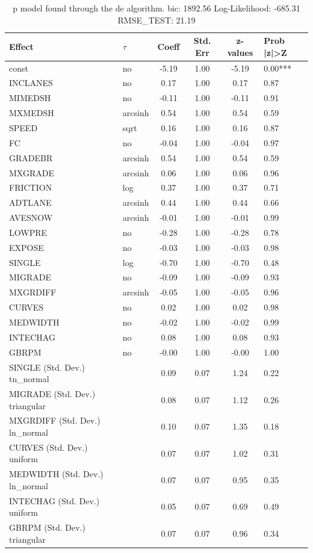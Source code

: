\begin{table}
	\caption{p model found through the de algorithm. bic: 1892.56 Log-Likelihood: -685.31 RMSE_TEST: 21.19}
	\begin{center}
		\begin{tabular}{|l|l|c|c|c|l|}
			\hline
			Effect & $\tau$ & Coeff & Std. Err & z-values & Prob |z|>Z \\
			\hline
			const & no & -5.19 & 1.00 & -5.19 & 0.00*** \\
			\hline
			INCLANES & no & 0.17 & 1.00 & 0.17 & 0.87 \\
			\hline
			MIMEDSH & no & -0.11 & 1.00 & -0.11 & 0.91 \\
			\hline
			MXMEDSH & arcsinh & 0.54 & 1.00 & 0.54 & 0.59 \\
			\hline
			SPEED & sqrt & 0.16 & 1.00 & 0.16 & 0.87 \\
			\hline
			FC & no & -0.04 & 1.00 & -0.04 & 0.97 \\
			\hline
			GRADEBR & arcsinh & 0.54 & 1.00 & 0.54 & 0.59 \\
			\hline
			MXGRADE & arcsinh & 0.06 & 1.00 & 0.06 & 0.96 \\
			\hline
			FRICTION & log & 0.37 & 1.00 & 0.37 & 0.71 \\
			\hline
			ADTLANE & arcsinh & 0.44 & 1.00 & 0.44 & 0.66 \\
			\hline
			AVESNOW & arcsinh & -0.01 & 1.00 & -0.01 & 0.99 \\
			\hline
			LOWPRE & no & -0.28 & 1.00 & -0.28 & 0.78 \\
			\hline
			EXPOSE & no & -0.03 & 1.00 & -0.03 & 0.98 \\
			\hline
			SINGLE & log & -0.70 & 1.00 & -0.70 & 0.48 \\
			\hline
			MIGRADE & no & -0.09 & 1.00 & -0.09 & 0.93 \\
			\hline
			MXGRDIFF & arcsinh & -0.05 & 1.00 & -0.05 & 0.96 \\
			\hline
			CURVES & no & 0.02 & 1.00 & 0.02 & 0.98 \\
			\hline
			MEDWIDTH & no & -0.02 & 1.00 & -0.02 & 0.99 \\
			\hline
			INTECHAG & no & 0.08 & 1.00 & 0.08 & 0.93 \\
			\hline
			GBRPM & no & -0.00 & 1.00 & -0.00 & 1.00 \\
			\hline
			SINGLE (Std. Dev.) tn_normal &  & 0.09 & 0.07 & 1.24 & 0.22 \\
			\hline
			MIGRADE (Std. Dev.) triangular &  & 0.08 & 0.07 & 1.12 & 0.26 \\
			\hline
			MXGRDIFF (Std. Dev.) ln_normal &  & 0.10 & 0.07 & 1.35 & 0.18 \\
			\hline
			CURVES (Std. Dev.) uniform &  & 0.07 & 0.07 & 1.02 & 0.31 \\
			\hline
			MEDWIDTH (Std. Dev.) ln_normal &  & 0.07 & 0.07 & 0.95 & 0.35 \\
			\hline
			INTECHAG (Std. Dev.) uniform &  & 0.05 & 0.07 & 0.69 & 0.49 \\
			\hline
			GBRPM (Std. Dev.) triangular &  & 0.07 & 0.07 & 0.96 & 0.34 \\
			\hline
		\end{tabular}
	\end{center}
\end{table}